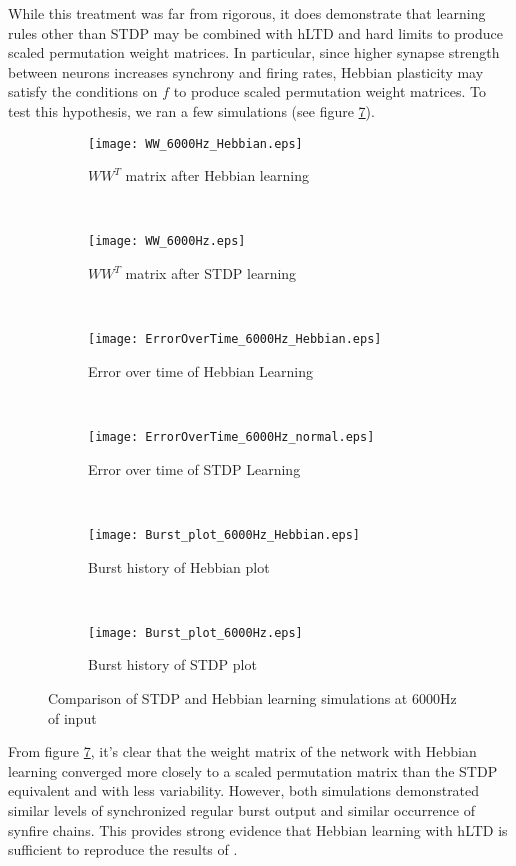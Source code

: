 While this treatment was far from rigorous, it does demonstrate that learning rules other than STDP may be combined with hLTD and hard limits to produce scaled permutation weight matrices. In particular, since higher synapse strength between neurons increases synchrony and firing rates, Hebbian plasticity may satisfy the conditions on \(f\) to produce scaled permutation weight matrices. To test this hypothesis, we ran a few simulations (see figure \ref{Compare}).

\begin{figure}[H]
\centering
\begin{subfigure}[b]{0.49\textwidth}
\texttt{[image: WW\_6000Hz\_Hebbian.eps]}
\caption{\(WW^T\) matrix after Hebbian learning}
\label{Compare: WW_Hebbian}
\end{subfigure}
\,
\begin{subfigure}[b]{0.49\textwidth}
\texttt{[image: WW\_6000Hz.eps]}
\caption{\(WW^T\) matrix after STDP learning}
\label{Compare: WW_STDP}
\end{subfigure}
\\
\begin{subfigure}[b]{0.49\textwidth}
\texttt{[image: ErrorOverTime\_6000Hz\_Hebbian.eps]}
\caption{Error over time of Hebbian Learning}
\label{Compare: EoT_Hebbian}
\end{subfigure}
\,
\begin{subfigure}[b]{0.49\textwidth}
\texttt{[image: ErrorOverTime\_6000Hz\_normal.eps]}
\caption{Error over time of STDP Learning}
\label{Compare: EoT_STDP}
\end{subfigure}
\\
\begin{subfigure}[b]{0.49\textwidth}
\texttt{[image: Burst\_plot\_6000Hz\_Hebbian.eps]}
\caption{Burst history of Hebbian plot}
\label{Compare: BH_Hebbian}
\end{subfigure}
\,
\begin{subfigure}[b]{0.49\textwidth}
\texttt{[image: Burst\_plot\_6000Hz.eps]}
\caption{Burst history of STDP plot}
\label{Compare: BH_STDP}
\end{subfigure}
\caption{Comparison of STDP and Hebbian learning simulations at 6000Hz of input}
\label{Compare}
\end{figure}

From figure \ref{Compare}, it's clear that the weight matrix of the network with Hebbian learning converged more closely to a scaled permutation matrix than the STDP equivalent and with less variability. However, both simulations demonstrated similar levels of synchronized regular burst output and similar occurrence of synfire chains. This provides strong evidence that Hebbian learning with hLTD is sufficient to reproduce the results of \cite{Fiete}.
